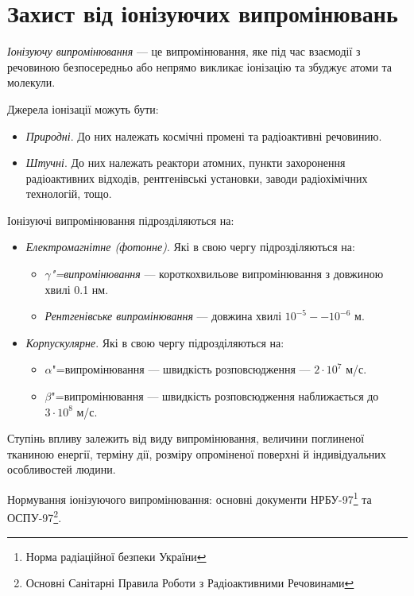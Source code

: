 \documentclass[a5paper,10pt,notitlepage,pdftex,headsepline]{scrartcl}
\begin{document}
\section{Захист від іонізуючих випромінювань}
  \emph{Іонізуючу випромінювання} --- це випромінювання, яке під час взаємодії
  з речовиною безпосередньо або непрямо викликає іонізацію та збуджує атоми та
  молекули.

  Джерела іонізації можуть бути:
  \begin{itemize}
    \item \emph{Природні}.
      До них належать космічні промені та радіоактивні речовинию.
    \item \emph{Штучні}.
      До них належать реактори атомних, пункти захоронення радіоактивних
      відходів, рентгенівські установки, заводи радіохімічних технологій,
      тощо.
  \end{itemize}

  Іонізуючі випромінювання підрозділяються на:
  \begin{itemize}
    \item \emph{Електромагнітне (фотонне)}.
      Які в свою чергу підрозділяються на:
      \begin{itemize}
        \item \emph{$\gamma$"=випромінювання} --- короткохвильове
          випромінювання з довжиною хвилі 0.1 нм.
        \item \emph{Рентгенівське випромінювання} --- довжина хвилі
          $10^{-5}--10^{-6}$ м.
      \end{itemize}
    \item \emph{Корпускулярне}.
      Які в свою чергу підрозділяються на:
      \begin{itemize}
        \item $\alpha$"=випромінювання --- швидкість розповсюдження ---
          $2\cdot 10^{7}$ м/с.
        \item $\beta$"=випромінювання --- швидкість розповсюдження
          наближається до $3\cdot 10^8$ м/с.
      \end{itemize}
  \end{itemize}

  Ступінь впливу залежить від виду випромінювання, величини поглиненої
  тканиною енергії, терміну дії, розміру опроміненої поверхні й індивідуальних
  особливостей людини.

  Нормування іонізуючого випромінювання: основні документи
  НРБУ-97\footnote{Норма радіаційної безпеки України} та
  ОСПУ-97\footnote{Основні Санітарні Правила Роботи з Радіоактивними
  Речовинами}.
\end{document}
